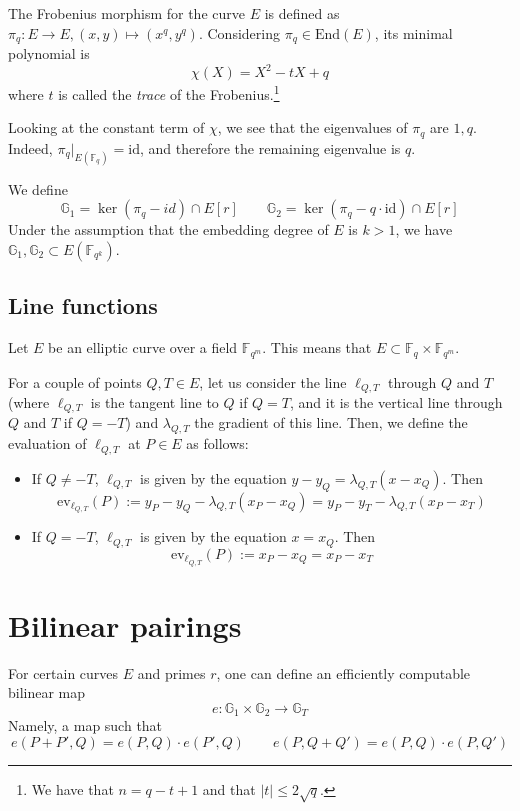 \documentclass{article}
\newcommand{\gOne}{\mathbb{G}_1}
\newcommand{\gTwo}{\mathbb{G}_2}
\newcommand{\ee}{e \colon \mathbb{G}_1 \times \mathbb{G}_2 \rightarrow \mathbb{G}_T}
\newcommand{\ev}{\mathrm{ev}}
\newcommand{\fq}[1]{\mathbb{F}_{q^{#1}}}
\newcommand{\frob}{\pi_q}
\theoremstyle{remark}
\theoremstyle{plain}
\begin{document}
The Frobenius morphism for the curve $E$ is defined as $\frob \colon E \rightarrow E, (x,y) \mapsto (x^q,y^q)$.
Considering $\frob \in \mathrm{End}(E)$, its minimal polynomial is
\[
    \chi(X) = X^2 - tX + q
\]
where $t$ is called the \emph{trace} of the Frobenius.\footnote{We have that $n = q - t + 1$ and that $\vert t \vert \leq 2 \sqrt{q}$.}

Looking at the constant term of $\chi$, we see that the eigenvalues of $\frob$ are $1, q$.
Indeed, $\frob \vert_{E(\fq{})} = \mathrm{id}$, and therefore the remaining eigenvalue is $q$.

We define
\[
\gOne = \ker (\frob - id) \cap E[r] \quad \quad \gTwo = \ker (\frob - q \cdot \mathrm{id}) \cap E[r]
\]
Under the assumption that the embedding degree of $E$ is $k > 1$, we have $\gOne, \gTwo \subset E(\fq{k})$.

\subsection{Line functions}

Let $E$ be an elliptic curve over a field $\fq{m}$.
This means that $E \subset \fq{} \times \fq{m}$.

For a couple of points $Q,T \in E$, let us consider the line $\ell_{Q,T}$ through $Q$ and $T$ (where $\ell_{Q,T}$ is the tangent line to $Q$ if $Q = T$, and it is the vertical line through $Q$ and $T$ if $Q = -T$) and $\lambda_{Q,T}$ the gradient of this line.
Then, we define the evaluation of $\ell_{Q,T}$ at $P \in E$ as follows:
\begin{itemize}
    \item If $Q \neq -T$, $\ell_{Q,T}$ is given by the equation $y - y_Q = \lambda_{Q,T} (x - x_Q)$. Then
    \[
        \ev_{\ell_{Q,T}}(P) := y_P - y_Q - \lambda_{Q,T} (x_P - x_Q) = y_P - y_T - \lambda_{Q,T} (x_P - x_T)
    \]
    \item If $Q = -T$, $\ell_{Q,T}$ is given by the equation $x = x_Q$. Then
    \[
        \ev_{\ell_{Q,T}}(P) := x_P - x_Q = x_P - x_T
    \]
\end{itemize}

\section{Bilinear pairings}

For certain curves $E$ and primes $r$, one can define an efficiently computable bilinear map
\[
\ee
\]
Namely, a map such that
\[
    e(P + P', Q) = e(P,Q) \cdot e(P',Q) \quad \quad e(P, Q + Q') = e(P, Q) \cdot e(P, Q')
\]
\end{document}
